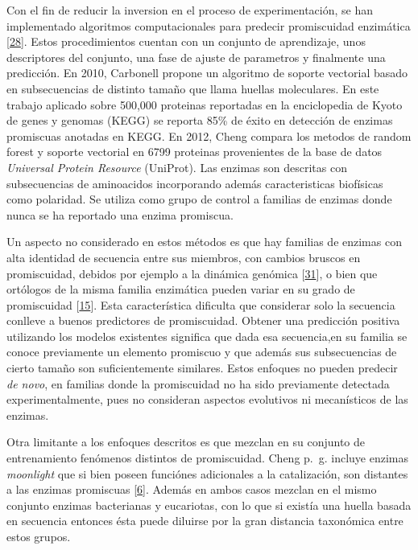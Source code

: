 \documentclass[12pt,twoside]{reedthesis}
\begin{document}
  Con el fin de reducir la inversion en el proceso de experimentación, se
  han implementado algoritmos computacionales para predecir promiscuidad
  enzimática {[}\protect\hyperlink{ref-carbonell_molecular_2010}{28}{]}.
  Estos procedimientos cuentan con un conjunto de aprendizaje, unos
  descriptores del conjunto, una fase de ajuste de parametros y finalmente
  una predicción. En 2010, Carbonell propone un algoritmo de soporte
  vectorial basado en subsecuencias de distinto tamaño que llama huellas
  moleculares. En este trabajo aplicado sobre 500,000 proteinas reportadas
  en la enciclopedia de Kyoto de genes y genomas (KEGG) se reporta 85\% de
  éxito en detección de enzimas promiscuas anotadas en KEGG. En 2012,
  Cheng compara los metodos de random forest y soporte vectorial en 6799
  proteinas provenientes de la base de datos \emph{Universal Protein
  Resource} (UniProt). Las enzimas son descritas con subsecuencias de
  aminoacidos incorporando además caracteristicas biofísicas como
  polaridad. Se utiliza como grupo de control a familias de enzimas donde
  nunca se ha reportado una enzima promiscua.
  
  Un aspecto no considerado en estos métodos es que hay familias de
  enzimas con alta identidad de secuencia entre sus miembros, con cambios
  bruscos en promiscuidad, debidos por ejemplo a la dinámica genómica
  {[}\protect\hyperlink{ref-noda-garcia_evolution_2013}{31}{]}, o bien que
  ortólogos de la misma familia enzimática pueden variar en su grado de
  promiscuidad {[}\protect\hyperlink{ref-bloom_neutral_2007}{15}{]}. Esta
  característica dificulta que considerar solo la secuencia conlleve a
  buenos predictores de promiscuidad. Obtener una predicción positiva
  utilizando los modelos existentes significa que dada esa secuencia,en su
  familia se conoce previamente un elemento promiscuo y que además sus
  subsecuencias de cierto tamaño son suficientemente similares. Estos
  enfoques no pueden predecir \emph{de novo}, en familias donde la
  promiscuidad no ha sido previamente detectada experimentalmente, pues no
  consideran aspectos evolutivos ni mecanísticos de las enzimas.
  
  Otra limitante a los enfoques descritos es que mezclan en su conjunto de
  entrenamiento fenómenos distintos de promiscuidad. Cheng p.~g. incluye
  enzimas \emph{moonlight} que si bien poseen funciónes adicionales a la
  catalización, son distantes a las enzimas promiscuas
  {[}\protect\hyperlink{ref-copley_enzymes_2003}{6}{]}. Además en ambos
  casos mezclan en el mismo conjunto enzimas bacterianas y eucariotas, con
  lo que si existía una huella basada en secuencia entonces ésta puede
  diluirse por la gran distancia taxonómica entre estos grupos.
  
\end{document}
